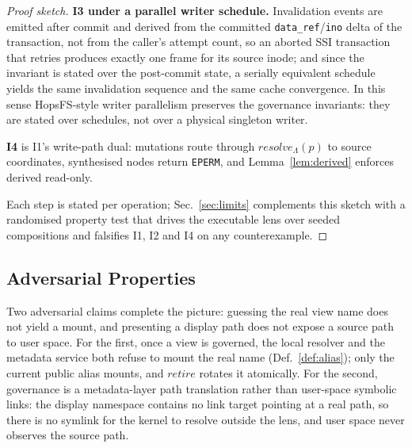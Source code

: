 \documentclass[numberedsection,acmtos]{acmart}
\begin{document}
\begin{proof}[Proof sketch]
\textbf{I3 under a parallel writer schedule.} Invalidation events are emitted
after commit and derived from the committed
\texttt{data\_ref}/\texttt{ino} delta of the transaction, not from the
caller's attempt count, so an aborted SSI transaction that retries produces
exactly one frame for its source inode; and since the invariant is stated
over the post-commit state, a serially equivalent schedule
\citep{ports2012} yields the same invalidation sequence and the same cache
convergence. In this sense HopsFS-style \citep{hopsfs} writer parallelism
preserves the governance invariants: they are stated over schedules, not
over a physical singleton writer.

\textbf{I4} is I1's write-path dual: mutations route through
$\mathit{resolve}_\Lambda(p)$ to source coordinates, synthesised nodes return
\texttt{EPERM}, and Lemma~\ref{lem:derived} enforces derived read-only.

Each step is stated per operation; Sec.~\ref{sec:limits} complements this
sketch with a randomised property test that drives the executable lens over
seeded compositions and falsifies I1, I2 and I4 on any counterexample.
\end{proof}

\subsection{Adversarial Properties}\label{sec:adv}

Two adversarial claims complete the picture: guessing the real view name does
not yield a mount, and presenting a display path does not expose a source path
to user space. For the first, once a view is governed, the local resolver and
the metadata service both refuse to mount the real name (Def.~\ref{def:alias});
only the current public alias mounts, and $\mathit{retire}$ rotates it
atomically. For the second, governance is a metadata-layer path translation
rather than user-space symbolic links: the display namespace contains no link
target pointing at a real path, so there is no symlink for the kernel to
resolve outside the lens, and user space never observes the source path.
\end{document}
